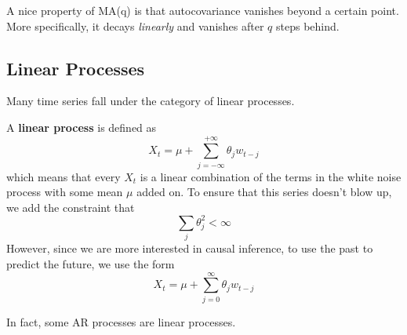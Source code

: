\documentclass{article}
\begin{document}
  \begin{theorem}
    A nice property of MA(q) is that autocovariance vanishes beyond a certain point. More specifically, it decays \textit{linearly} and vanishes after $q$ steps behind. 
  \end{theorem}

\subsection{Linear Processes}

  Many time series fall under the category of linear processes. 

  \begin{definition}
    A \textbf{linear process} is defined as 
    \begin{equation}
      X_t = \mu + \sum_{j=-\infty}^{+\infty} \theta_j w_{t-j}
    \end{equation}
    which means that every $X_t$ is a linear combination of the terms in the white noise process with some mean $\mu$ added on. To ensure that this series doesn't blow up, we add the constraint that 
    \begin{equation}
      \sum_{j} \theta_j^2 < \infty
    \end{equation}
    However, since we are more interested in causal inference, to use the past to predict the future, we use the form 
    \begin{equation}
      X_t = \mu + \sum_{j=0}^{\infty} \theta_j w_{t-j}
    \end{equation}
  \end{definition}

  In fact, some AR processes are linear processes. 
\end{document}
